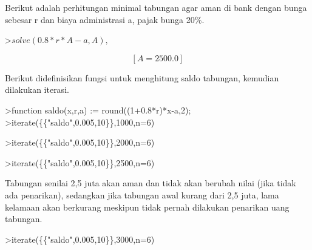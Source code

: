 \documentclass[a4paper,10pt]{article}
\begin{document}
\begin{eulernotebook}
\begin{eulercomment}
\begin{eulercomment}
\begin{eulercomment}
\begin{eulercomment}
\begin{eulercomment}
\begin{eulercomment}
\begin{eulercomment}
\begin{eulercomment}
\begin{eulercomment}
\begin{eulercomment}
\begin{eulercomment}
\begin{eulercomment}
\begin{eulercomment}
\begin{eulercomment}
\begin{eulercomment}
\begin{eulercomment}
\begin{eulercomment}
\begin{eulercomment}
\begin{eulercomment}
\begin{eulercomment}
\begin{eulercomment}
Berikut adalah perhitungan minimal tabungan agar aman di bank dengan bunga sebesar r dan
biaya administrasi a, pajak bunga 20\%.
\end{eulercomment}
\begin{eulerprompt}
>$solve(0.8*r*A-a,A), $%
\end{eulerprompt}
\begin{eulerformula}
\[
\left[ A=2500.0 \right] 
\]
\end{eulerformula}
\begin{eulercomment}
Berikut didefinisikan fungsi untuk menghitung saldo tabungan, kemudian dilakukan iterasi.
\end{eulercomment}
\begin{eulerprompt}
>function saldo(x,r,a) := round((1+0.8*r)*x-a,2);
>iterate(\{\{"saldo",0.005,10\}\},1000,n=6)
\end{eulerprompt}
\begin{euleroutput}
  [1000,  994,  987.98,  981.93,  975.86,  969.76,  963.64]
\end{euleroutput}
\begin{eulerprompt}
>iterate(\{\{"saldo",0.005,10\}\},2000,n=6)
\end{eulerprompt}
\begin{euleroutput}
  [2000,  1998,  1995.99,  1993.97,  1991.95,  1989.92,  1987.88]
\end{euleroutput}
\begin{eulerprompt}
>iterate(\{\{"saldo",0.005,10\}\},2500,n=6)
\end{eulerprompt}
\begin{euleroutput}
  [2500,  2500,  2500,  2500,  2500,  2500,  2500]
\end{euleroutput}
\begin{eulercomment}
Tabungan senilai 2,5 juta akan aman dan tidak akan berubah nilai (jika tidak ada penarikan),
sedangkan jika tabungan awal kurang dari 2,5 juta, lama kelamaan akan berkurang meskipun
tidak pernah dilakukan penarikan uang tabungan.
\end{eulercomment}
\begin{eulerprompt}
>iterate(\{\{"saldo",0.005,10\}\},3000,n=6)
\end{eulerprompt}
\begin{euleroutput}
  [3000,  3002,  3004.01,  3006.03,  3008.05,  3010.08,  3012.12]
\end{euleroutput}

\end{eulercomment}
\end{eulercomment}
\end{eulercomment}
\end{eulercomment}
\end{eulercomment}
\end{eulercomment}
\end{eulercomment}
\end{eulercomment}
\end{eulercomment}
\end{eulercomment}
\end{eulercomment}
\end{eulercomment}
\end{eulercomment}
\end{eulercomment}
\end{eulercomment}
\end{eulercomment}
\end{eulercomment}
\end{eulercomment}
\end{eulercomment}
\end{eulercomment}
\end{eulernotebook}
\end{document}
